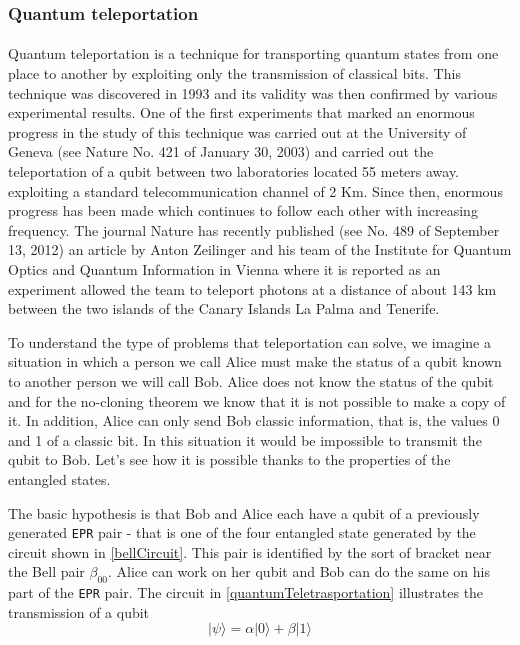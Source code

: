 \documentclass[a4paper,10pt]{article}
\begin{document}
\subsubsection{Quantum teleportation}

\paragraph{} Quantum teleportation is a technique for transporting quantum states from one place to another by exploiting only the transmission of classical bits. This technique was discovered in 1993 and its validity was then confirmed by various experimental results. One of the first experiments that marked an enormous progress in the study of this technique was carried out at the University of Geneva (see Nature No. 421 of January 30, 2003) and carried out the teleportation of a qubit between two laboratories located 55 meters away. exploiting a standard telecommunication channel of 2 Km. Since then, enormous progress has been made which continues to follow each other with increasing frequency. The journal Nature has recently published (see No. 489 of September 13, 2012) an article by Anton Zeilinger and his team of the Institute for Quantum Optics and Quantum Information in Vienna where it is reported as an experiment allowed the team to teleport photons at a distance of about 143 km between the two islands of the Canary Islands La Palma and Tenerife.

To understand the type of problems that teleportation can solve, we imagine a situation in which a person we call Alice must make the status of a qubit known to another person we will call Bob. Alice does not know the status of the qubit and for the no-cloning theorem we know that it is not possible to make a copy of it. In addition, Alice can only send Bob classic information, that is, the values 0 and 1 of a classic bit. In this situation it would be impossible to transmit the qubit to Bob. Let's see how it is possible thanks to the properties of the entangled states.

The basic hypothesis is that Bob and Alice each have a qubit of a previously generated \texttt{EPR} pair - that is one of the four entangled state generated by the circuit shown in \autoref{bellCircuit}. This pair is identified by the sort of bracket near the Bell pair $\beta_{00}$. Alice can work on her qubit and Bob can do the same on his part of the \texttt{EPR} pair. The circuit in \autoref{quantumTeletrasportation} illustrates the transmission of a qubit 
$$|\psi\rangle = \alpha|0\rangle + \beta|1\rangle$$
\end{document}
